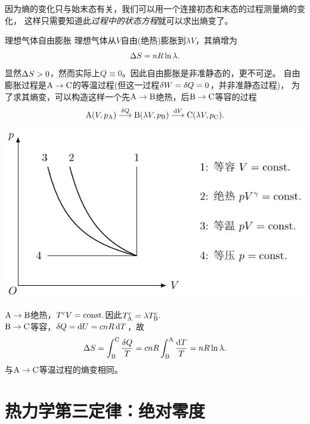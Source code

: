 因为熵的变化只与始末态有关，我们可以用一个连接初态和末态的过程测量熵的变化，%
这样只需要知道此\textit{过程中的状态方程}就可以求出熵变了。

\begin{example}
	{理想气体自由膨胀}{}
	理想气体从$V$自由(绝热)膨胀到$\lambda V$，其熵增为
	\[
		\Delta S=nR\ln\lambda.
	\]
	显然$\Delta S>0$，然而实际上$Q\equiv 0$。因此自由膨胀是非准静态的，更不可逆。
	\tcblower
	自由膨胀过程是$\text A\to\text C$的等温过程(但这一过程$\mathop{}\!\delta W=\mathop{}\!\delta Q=0$，并非准静态过程)，
	为了求其熵变，可以构造这样一个先$\text A\to\text B$绝热，后$\text B\to\text C$等容的过程
	\[
		\text A(V,p_\text A)\overset{\mathop{}\!\delta Q}\longrightarrow\text B(\lambda V,p_\text B)\overset{\mathop{}\!\mathrm{d} V}\longrightarrow\text C(\lambda V,p_\text C).
	\]
	\begin{center}
		\includegraphics[page=4]{figures/tikz/coordinates.pdf}		
	\end{center}
	$\text A\to\text B$绝热，$T^cV=\text{const}.$因此$T_\text A^c=\lambda T_\text B^c.$\\[1ex]
	$\text B\to\text C$等容，$\mathop{}\!\delta Q=\mathop{}\!\mathrm{d} U=cnR\mathop{}\!\mathrm{d} T$，故 
	\[
		\Delta S=\int_\text B^\text C\frac{\mathop{}\!\delta Q}T=cnR\int_\text B^\text A\frac{\mathop{}\!\mathrm{d} T}T=nR\ln\lambda.
	\]
	与$\text A\to\text C$等温过程的熵变相同。
\end{example}


\section{热力学第三定律：绝对零度}

